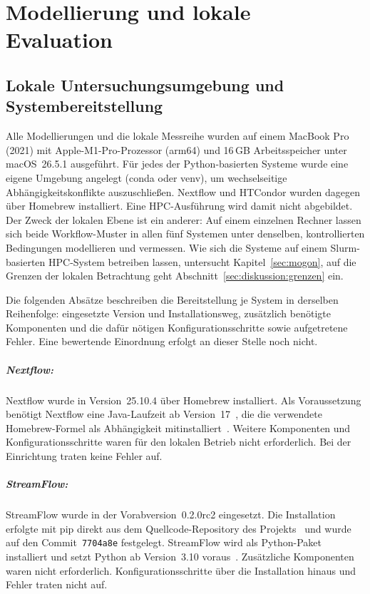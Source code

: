 
\lstset{breaklines=true, breakatwhitespace=false}

\chapter{Modellierung und lokale Evaluation}
\label{sec:lokal}

\section{Lokale Untersuchungsumgebung und Systembereitstellung}
\label{sec:lokal:umgebung}

Alle Modellierungen und die lokale Messreihe wurden auf einem MacBook
Pro (2021) mit Apple-M1-Pro-Prozessor (arm64) und 16\,GB
Arbeitsspeicher unter macOS~26.5.1 ausgeführt. Für jedes der
Python-basierten Systeme wurde eine eigene Umgebung angelegt (conda
oder venv), um wechselseitige Abhängigkeitskonflikte auszuschließen.
Nextflow und HTCondor wurden dagegen über Homebrew installiert. Eine
HPC-Ausführung wird damit nicht abgebildet. Der Zweck der lokalen
Ebene ist ein anderer: Auf einem einzelnen Rechner lassen sich beide
Workflow-Muster in allen fünf Systemen unter denselben,
kontrollierten Bedingungen modellieren und vermessen. Wie sich die
Systeme auf einem Slurm-basierten HPC-System betreiben lassen,
untersucht Kapitel~\ref{sec:mogon}, auf die Grenzen der lokalen
Betrachtung geht Abschnitt~\ref{sec:diskussion:grenzen} ein.

Die folgenden Absätze beschreiben die Bereitstellung je System in
derselben Reihenfolge: eingesetzte Version und Installationsweg,
zusätzlich benötigte Komponenten und die dafür nötigen
Konfigurationsschritte sowie aufgetretene Fehler. Eine bewertende
Einordnung erfolgt an dieser Stelle noch nicht.

\paragraph{Nextflow:} Nextflow wurde in Version~25.10.4 über Homebrew
installiert. Als Voraussetzung benötigt Nextflow eine Java-Laufzeit
ab Version~17~\cite{nextflowdocs-install}, die die verwendete
Homebrew-Formel als Abhängigkeit mitinstalliert~\cite{brewnextflow}.
Weitere Komponenten und Konfigurationsschritte waren für den lokalen
Betrieb nicht erforderlich. Bei der Einrichtung traten keine Fehler
auf.

\paragraph{StreamFlow:} StreamFlow wurde in der Vorabversion~0.2.0rc2
eingesetzt. Die Installation erfolgte mit pip direkt aus dem
Quellcode-Repository des Projekts~\cite{streamflowrepo} und wurde auf
den Commit~\texttt{7704a8e} festgelegt. StreamFlow wird als
Python-Paket installiert und setzt Python ab Version~3.10
voraus~\cite{streamflowdocs}. Zusätzliche Komponenten waren nicht
erforderlich. Konfigurationsschritte über die
Installation hinaus und Fehler traten nicht auf.

